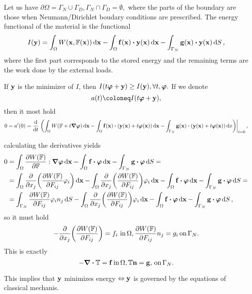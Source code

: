 \documentclass[reqno, a4paper]{article}
\begin{document}
\begin{definition}
    Let us have $\partial \Omega = \Gamma_N \cup \Gamma_D, \Gamma_N \cap \Gamma_D = \emptyset,$ where the parts of the boundary are those when Neumann/Dirichlet boudary conditions are prescribed.
The energy functional of the material is the functional
\[
	I\qty(\vb{y}) = \int_{\Omega}W\qty(\vb{x}, \fgrad\qty(\vb{x}))\dd{\vb{x}} - \int_{\Omega}\vb{f}\qty(\vb{x})\vdot \vb{y}\qty(\vb{x}) \dd{\vb{x}}-\int_{\Gamma_N}\vb{g}\qty(\vb{x}) \vdot \vb{y}\qty(\vb{x})\dd{S},
\]
where the first part corresponds to the stored energy and the remaining terms are the work done by the external loads.
\end{definition}

\begin{remark}
	If $\vb{y}$ is the minimizer of $I$, then $I\qty(t \vb*{\varphi}+\vb{y})\geq I\qty(\vb{y}), \forall t, \vb*{\varphi}.$ If we denote
    \[
	    a(t)\coloneq I\qty(t \vb*{\varphi}+\vb{y}),
    \]
    then it most hold
    \[
	    0 = a'(0) = \dv{t} \eval{\qty(\int_{\Omega}W\qty(\fgrad + t \grad \vb*{\varphi})\dd{\vb{x}}- \int_{\Omega}\vb{f}\qty(\vb{x})\vdot \qty(\vb{y}\qty(\vb{x})+t \vb*{\varphi}\qty(\vb{x}))\dd{\vb{x}} - \int_{\Gamma_N}\vb{g}\qty(\vb{x}) \vdot(\vb{y}\qty(\vb{x})+t \vb*{\varphi}\qty(\vb{x}))\dd{x})}_{t=0},
    \]

calculating the derivatives yields
\begin{align*}
	0 &= \int_{\Omega}\pdv{W\qty(\fgrad)}{\fgrad}: \grad \vb*{\varphi}\dd{\vb{x}} - \int_{\Omega}\vb{f}\vdot \vb*{\varphi}\dd{\vb{x}} - \int_{\Gamma_N}\vb{g}\vdot \vb*{\varphi}\dd{S} =\\
	  &= \int_{\Omega}\pdv{x_j}\qty(\pdv{W\qty(\fgrad)}{F_{ij}}\varphi_i)\dd{\vb{x}}-\int_{\Omega}\pdv{x_j}\qty(\pdv{W\qty(\fgrad)}{F_{ij}})\varphi_i\dd{\vb{x}}- \int_{\Omega}\vb{f}\vdot \vb*{\varphi}\dd{\vb{x}}-\int_{\Gamma_N}\vb{g}\vdot \vb*{\varphi}\dd{S}= \\
	  & = \int_{\Gamma_N}\pdv{W\qty(\fgrad)}{F_{ij}}\varphi_i n_j \dd{S}-\int_{\Omega}\pdv{x_j}\qty(\pdv{W\qty(\fgrad)}{F_{ij}})\varphi_i\dd{\vb{x}}-\int_{\Omega}\vb{f}\vdot \vb*{\varphi}\dd{\vb{x}} - \int_{\Gamma_N}\vb{g} \vdot \vb*{\varphi}\dd{S},
\end{align*}
so it must hold
\[
	-\pdv{x_j}\qty(\pdv{W\qty(\ensuremath{\mathbb{F}})}{F_{ij}})= f_i \ \text{in} \, \Omega, \pdv{W\qty(\ensuremath{\mathbb{F}})}{F_{ij}}n_j=g_i \, \text{on} \, \Gamma_N.
\]
This is exactly
\[
	-\divergence{\pkstress} = \vb{f} \, \text{in} \,\Omega, \pkstress \vb{n} = \vb{g}, \, \text{on} \, \Gamma_N.
\]

This implies that $\vb{y}$ minimizes energy $\Leftrightarrow \vb{y}$ is governed by the equations of classical mechanis.

\end{remark}
\end{document}
